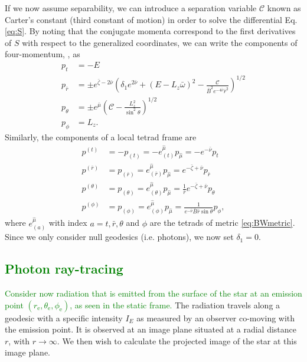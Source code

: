 \documentclass{aa}
\makeatletter
\def\fvec#1{\underline{\sbox\tw@{$#1$}\dp\tw@\z@\box\tw@}}
\newcommand{\refe}[1]{\textcolor{green}{{#1}}}
\newcommand{\Ca}{\ensuremath{\mathcal{C}}}
\newcommand{\rb}{\ensuremath{\bar{r}}}
\newcommand{\wb}{\ensuremath{\bar{\omega}}}
\newcommand{\nub}{\ensuremath{\bar{\nu}}}
\newcommand{\zetab}{\ensuremath{\bar{\zeta}}}
\newcommand{\Bb}{\ensuremath{\bar{B}}}
\newcommand{\mub}{\ensuremath{\bar{\mu}}}
\makeatother
\begin{document}
If we now assume separability, we can introduce a separation variable $\Ca$ known as Carter's constant (third constant of motion) in order to solve the differential Eq. \eqref{eq:S}.  
By noting that the conjugate momenta correspond to the first derivatives of $S$ with respect to the generalized coordinates, we can write the components of four-momentum, \fvec{p}, as 
\begin{align}
  p_t        &= -E \label{eq:p_t}\\
  p_{\rb}    &= \pm e^{\zetab - 2\nub} \left( \delta_1 e^{2\nub} + (E - L_z \wb)^2 - \frac{\Ca}{\Bb^2 e^{-4\nub} \rb^2} \right)^{1/2}\label{eq:p_r}\\
  p_{\theta} &= \pm e^{\mub} \left( \Ca - \frac{L_z^2}{\sin^2\theta} \right)^{1/2}\label{eq:p_the}\\
  p_{\phi}   &= L_z\label{eq:p_p}.
\end{align}
Similarly, the components of a local tetrad frame are
\begin{align}
  p^{(t)} &= -p_{(t)} = -e_{(t)}^{\hat{\mu}} p_{\hat{\mu}} = -e^{-\nub}p_t \label{eq:tetp_t}\\
  p^{(\rb)} &= p_{(\rb)} = e_{(\rb)}^{\hat{\mu}} p_{\hat{\mu}} = e^{-\zetab + \nub} p_{\rb} \label{eq:tetp_r}\\
  p^{(\theta)} &= p_{(\theta)} = e_{(\theta)}^{\hat{\mu}} p_{\hat{\mu}} = \frac{1}{\rb} e^{-\zetab+\nub} p_{\theta} \label{eq:tetp_theta}\\
  p^{(\phi)} &= p_{(\phi)} = e_{(\phi)}^{\hat{\mu}} p_{\hat{\mu}} = \frac{1}{e^{-\nub} \Bb \rb \sin\theta} p_{\phi} \label{eq:tetp_phi},
\end{align}
where $e^{\hat{\mu}}_{(a)}$ with index $a = t, \rb, \theta$ and $\phi$ are the tetrads of metric \eqref{eq:BWmetric}.
Since we only consider null geodesics (i.e. photons), we now set $\delta_1 = 0$.

\subsection{\refe{Photon ray-tracing} }\label{sect:raytracing}
\refe{Consider now radiation that is emitted from the surface of the star at an emission point $(r_{\mathrm{e}},\theta_{\mathrm{e}},\phi_{\mathrm{e}})$, as seen in the static frame.}
The radiation travels along a geodesic with a specific intensity $I_{E}$ as measured by an observer co-moving with the emission point.  
It is observed at an image plane situated at a radial distance $r$, with $r\rightarrow\infty$.  
We then wish to calculate the projected image of the star at this image plane.
\end{document}
